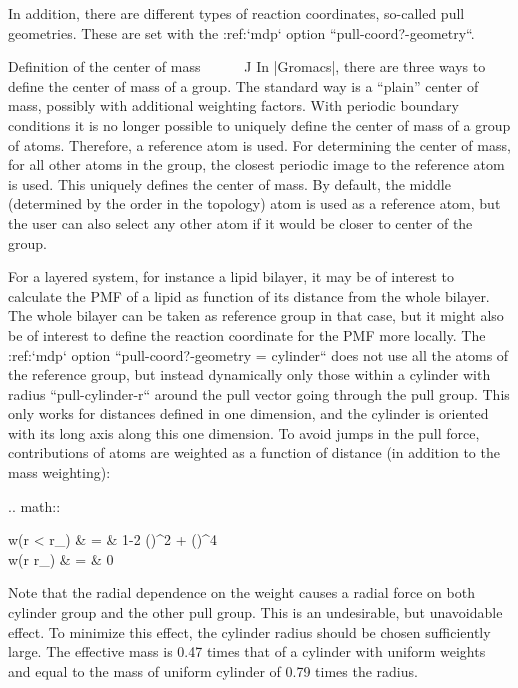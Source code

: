 In addition, there are different types of reaction coordinates,
so-called pull geometries. These are set with the :ref:`mdp`
option ``pull-coord?-geometry``.

Definition of the center of mass
^^^^^^^^^^^^^^^^^^^^^^^^^^^^^^^^

In |Gromacs|, there are three ways to define the center of mass of a
group. The standard way is a “plain” center of mass, possibly with
additional weighting factors. With periodic boundary conditions it is no
longer possible to uniquely define the center of mass of a group of
atoms. Therefore, a reference atom is used. For determining the center
of mass, for all other atoms in the group, the closest periodic image to
the reference atom is used. This uniquely defines the center of mass. By
default, the middle (determined by the order in the topology) atom is
used as a reference atom, but the user can also select any other atom if
it would be closer to center of the group.

For a layered system, for instance a lipid bilayer, it may be of
interest to calculate the PMF of a lipid as function of its distance
from the whole bilayer. The whole bilayer can be taken as reference
group in that case, but it might also be of interest to define the
reaction coordinate for the PMF more locally. The :ref:`mdp`
option ``pull-coord?-geometry = cylinder`` does not use all
the atoms of the reference group, but instead dynamically only those
within a cylinder with radius ``pull-cylinder-r`` around the
pull vector going through the pull group. This only works for distances
defined in one dimension, and the cylinder is oriented with its long
axis along this one dimension. To avoid jumps in the pull force,
contributions of atoms are weighted as a function of distance (in
addition to the mass weighting):

.. math::

   \begin{aligned}
   w(r < r_) & = &
   1-2 \left(\right)^2 + \left(\right)^4 \\
   w(r \geq r_\mathrm{cyl}) & = & 0\end{aligned}

Note that the radial dependence on the weight causes a radial force on
both cylinder group and the other pull group. This is an undesirable,
but unavoidable effect. To minimize this effect, the cylinder radius
should be chosen sufficiently large. The effective mass is 0.47 times
that of a cylinder with uniform weights and equal to the mass of uniform
cylinder of 0.79 times the radius.

